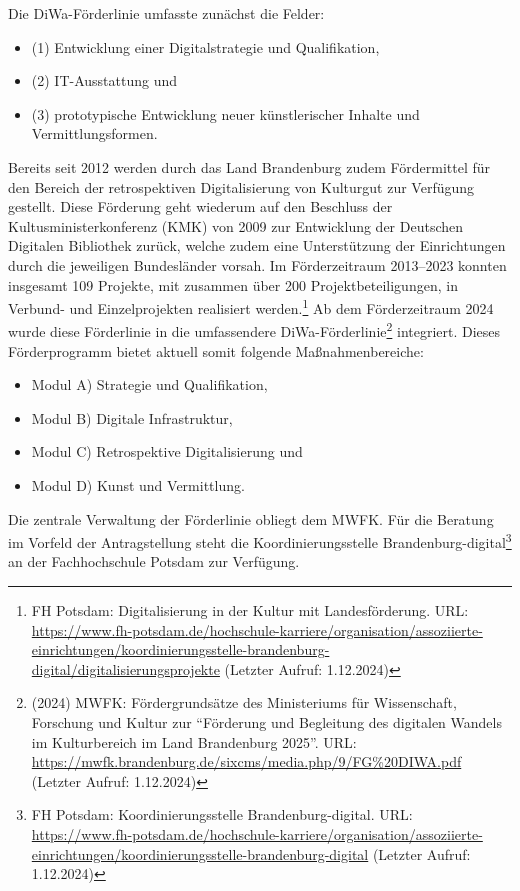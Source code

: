 \documentclass[a4paper,
fontsize=11pt,
oneside,
numbers=noperiodatend,
parskip=half-,
bibliography=totoc,
final
]{scrartcl}
\begin{document}
Die DiWa-Förderlinie umfasste zunächst die Felder:

\begin{itemize}
\item
  (1) Entwicklung einer Digitalstrategie und Qualifikation,
\item
  (2) IT-Ausstattung und
\item
  (3) prototypische Entwicklung neuer künstlerischer Inhalte und
  Vermittlungsformen.
\end{itemize}

Bereits seit 2012 werden durch das Land Brandenburg zudem Fördermittel
für den Bereich der retrospektiven Digitalisierung von Kulturgut zur
Verfügung gestellt. Diese Förderung geht wiederum auf den Beschluss der
Kultusministerkonferenz (KMK) von 2009 zur Entwicklung der Deutschen
Digitalen Bibliothek zurück, welche zudem eine Unterstützung der
Einrichtungen durch die jeweiligen Bundesländer vorsah. Im
Förderzeitraum 2013--2023 konnten insgesamt 109 Projekte, mit zusammen
über 200 Projektbeteiligungen, in Verbund- und Einzelprojekten
realisiert werden.\footnote{FH Potsdam: Digitalisierung in der Kultur
  mit Landesförderung. URL:
  \url{https://www.fh-potsdam.de/hochschule-karriere/organisation/assoziierte-einrichtungen/koordinierungsstelle-brandenburg-digital/digitalisierungsprojekte}
  (Letzter Aufruf: 1.12.2024)} Ab dem Förderzeitraum 2024 wurde diese
Förderlinie in die umfassendere DiWa-Förderlinie\footnote{(2024) MWFK:
  Fördergrundsätze des Ministeriums für Wissenschaft, Forschung und
  Kultur zur \enquote{Förderung und Begleitung des digitalen Wandels im
  Kulturbereich im Land Brandenburg 2025}. URL:
  \url{https://mwfk.brandenburg.de/sixcms/media.php/9/FG\%20DIWA.pdf}
  (Letzter Aufruf: 1.12.2024)} integriert. Dieses Förderprogramm bietet
aktuell somit folgende Maßnahmenbereiche:

\begin{itemize}
\item
  Modul A) Strategie und Qualifikation,
\item
  Modul B) Digitale Infrastruktur,
\item
  Modul C) Retrospektive Digitalisierung und
\item
  Modul D) Kunst und Vermittlung.
\end{itemize}

Die zentrale Verwaltung der Förderlinie obliegt dem MWFK. Für die
Beratung im Vorfeld der Antragstellung steht die Koordinierungsstelle
Brandenburg-digital\footnote{FH Potsdam: Koordinierungsstelle
  Brandenburg-digital. URL:
  \url{https://www.fh-potsdam.de/hochschule-karriere/organisation/assoziierte-einrichtungen/koordinierungsstelle-brandenburg-digital}
  (Letzter Aufruf: 1.12.2024)} an der Fachhochschule Potsdam zur
Verfügung.
\end{document}
